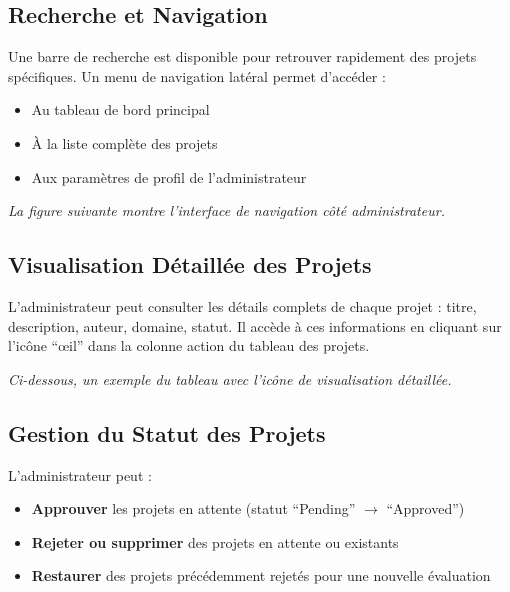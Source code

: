 \documentclass[12pt]{article}
\begin{document}
\subsection{Recherche et Navigation}

Une barre de recherche est disponible pour retrouver rapidement des projets spécifiques. Un menu de navigation latéral permet d’accéder :
\begin{itemize}
    \item Au tableau de bord principal
    \item À la liste complète des projets
    \item Aux paramètres de profil de l'administrateur
\end{itemize}


\vspace{0.5cm}
\textit{La figure suivante montre l’interface de navigation côté administrateur.}
\vspace{0.5cm}

\subsection{Visualisation Détaillée des Projets}

L'administrateur peut consulter les détails complets de chaque projet : titre, description, auteur, domaine, statut. Il accède à ces informations en cliquant sur l’icône “œil” dans la colonne action du tableau des projets.


\vspace{0.5cm}
\textit{Ci-dessous, un exemple du tableau avec l’icône de visualisation détaillée.}
\vspace{0.5cm}

\subsection{Gestion du Statut des Projets}

L'administrateur peut :
\begin{itemize}
    \item \textbf{Approuver} les projets en attente (statut “Pending” $\rightarrow$ “Approved”)
    \item \textbf{Rejeter ou supprimer} des projets en attente ou existants
    \item \textbf{Restaurer} des projets précédemment rejetés pour une nouvelle évaluation
\end{itemize}
\end{document}
